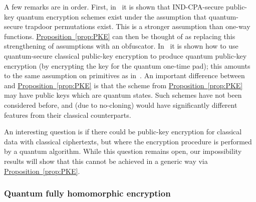 \documentclass[11pt]{article}
\numberwithin{equation}{section}
\newcommand{\expref}[2]{\texorpdfstring{\hyperref[#2]{#1~\ref{#2}}}{#1~\ref{#2}}}
\begin{document}
A few remarks are in order. First, in~\cite{ABGFSS15} it is shown that IND-CPA-secure public-key quantum encryption schemes exist under the assumption that quantum-secure trapdoor permutations exist. This is a stronger assumption than one-way functions. \expref{Proposition}{prop:PKE} can then be thought of as replacing this strengthening of assumptions with an obfuscator. In~\cite{BJ15} it is shown how to use quantum-secure classical public-key encryption to produce quantum public-key encryption (by encrypting the key for the quantum one-time pad); this amounts to the same assumption on primitives as in~\cite{ABGFSS15}. An important difference between~\cite{ABGFSS15, BJ15} and \expref{Proposition}{prop:PKE} is that the scheme from \expref{Proposition}{prop:PKE} may have public keys which are quantum states. Such schemes have not been considered before, and (due to no-cloning) would have significantly different features from their classical counterparts.

An interesting question is if there could be public-key encryption for classical data with classical ciphertexts, but where the encryption procedure is performed by a quantum algorithm. While this question remains open, our impossibility results will show that this cannot be achieved in a generic way via \expref{Proposition}{prop:PKE}.

\subsubsection{Quantum fully homomorphic encryption}
\end{document}
